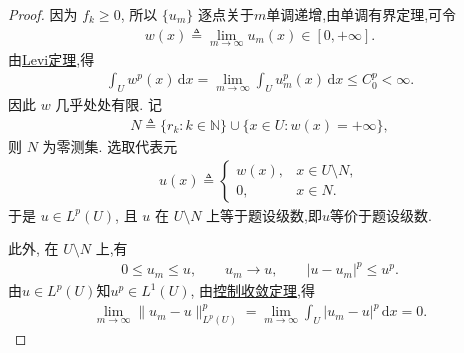 \documentclass[../../main.tex]{subfiles}
\begin{document}
\begin{proof}
因为 $f_k\geqslant0$, 所以 $\{u_m\}$ 逐点关于$m$单调递增,由单调有界定理,可令
\begin{align*}
w(x)\triangleq\lim\limits_{m\to\infty}u_m(x)\in[0,+\infty].
\end{align*}
由\hyperref[Real Analysis-theorem:Beppo Levi非负渐升列积分定理]{Levi定理},得
\begin{align*}
\int_Uw^p(x)\,\mathrm{d}x
=\lim\limits_{m\to\infty}\int_Uu_m^p(x)\,\mathrm{d}x
\leqslant C_0^p<\infty.
\end{align*}
因此 $w$ 几乎处处有限. 记
\begin{align}\label{eq:::jiijijiojiojwjiowfjiojfwio}
N\triangleq
\{r_k:k\in\mathbb{N}\}\cup\{x\in U:w(x)=+\infty\},
\end{align}
则 $N$ 为零测集. 选取代表元
\begin{align*}
u(x)\triangleq
\begin{cases}
w(x), & x\in U\setminus N,\\
0, & x\in N.
\end{cases}
\end{align*}
于是 $u\in L^p(U)$, 且 $u$ 在 $U\setminus N$ 上等于题设级数,即$u$等价于题设级数.

此外, 在 $U\setminus N$ 上,有
\begin{align*}
0\leqslant u_m\leqslant u,\qquad
u_m\longrightarrow u,\qquad
|u-u_m|^p\leqslant u^p.
\end{align*}
由$u\in L^p(U)$知$u^p\in L^1(U)$, 由\hyperref[Real Analysis-theorem:控制收敛定理]{控制收敛定理},得
\begin{align*}
\lim\limits_{m\to\infty}\|u_m-u\|_{L^p(U)}^p
=\lim\limits_{m\to\infty}
\int_U|u_m-u|^p\,\mathrm{d}x
=0.
\end{align*}


\end{proof}
\end{document}
